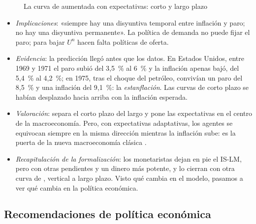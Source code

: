 \documentclass[11pt]{article}
\begin{document}
\begin{figure}[H]
\centering
\caption{La curva de  aumentada con expectativas: corto y largo plazo}\label{fig:phillips-aumentada}
\end{figure}

\begin{itemize}
\item \emph{Implicaciones}: «siempre hay una disyuntiva temporal entre inflación y paro; no hay una disyuntiva permanente»\nocite{Friedman1968Role}. La política de demanda no puede fijar el paro; para bajar $U^n$ hacen falta políticas de oferta.
\item \emph{Evidencia}: la predicción llegó antes que los datos. En Estados Unidos, entre 1969 y 1971 el paro subió del 3,5~\% al 6~\% y la inflación apenas bajó, del 5,4~\% al 4,2~\%; en 1975, tras el choque del petróleo, convivían un paro del 8,5~\% y una inflación del 9,1~\%: la \emph{estanflación}\nocite{BLS2026UNRATE,BLS2026CPI}. Las curvas de corto plazo se habían desplazado hacia arriba con la inflación esperada.
\item \emph{Valoración}: separa el corto plazo del largo y pone las expectativas en el centro de la macroeconomía. Pero, con expectativas adaptativas, los agentes se equivocan siempre en la misma dirección mientras la inflación sube: es la puerta de la nueva macroeconomía clásica\nocite{Lucas1972Expectations} .
\end{itemize}

\begin{itemize}
\item \emph{Recapitulación de la formalización}: los monetaristas dejan en pie el IS-LM, pero con otras pendientes y un dinero más potente, y lo cierran con otra curva de , vertical a largo plazo. Visto qué cambia en el modelo, pasamos a ver qué cambia en la política económica.
\end{itemize}

\subsection{Recomendaciones de política económica}\label{sec:politica}
\end{document}
